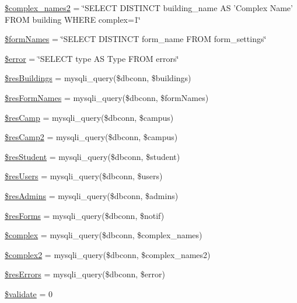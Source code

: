 \begin{DoxyCompactItemize}
\item 
\hyperlink{settings_8php_a1b9130a7b15f9d24c6c7b9f180f58c35}{\$complex\-\_\-names2} = \char`\"{}\-S\-E\-L\-E\-C\-T \-D\-I\-S\-T\-I\-N\-C\-T building\-\_\-name \-A\-S '\-Complex \-Name' \-F\-R\-O\-M building \-W\-H\-E\-R\-E complex=1\char`\"{}
\item 
\hyperlink{settings_8php_aeeee3257142a61e1147e755245933bc2}{\$form\-Names} = \char`\"{}\-S\-E\-L\-E\-C\-T \-D\-I\-S\-T\-I\-N\-C\-T form\-\_\-name \-F\-R\-O\-M form\-\_\-settings\char`\"{}
\item 
\hyperlink{settings_8php_aeba2ab722cedda53dbb7ec1a59f45550}{\$error} = \char`\"{}\-S\-E\-L\-E\-C\-T type \-A\-S \-Type \-F\-R\-O\-M errors\char`\"{}
\item 
\hyperlink{settings_8php_ad13e1ac4736397ee0c0755924e4a2167}{\$res\-Buildings} = mysqli\-\_\-query(\$dbconn, \$buildings)
\item 
\hyperlink{settings_8php_a3442ba39121c93784426f695600100ed}{\$res\-Form\-Names} = mysqli\-\_\-query(\$dbconn, \$form\-Names)
\item 
\hyperlink{settings_8php_a926be07138c512547f16ff9996acaf0b}{\$res\-Camp} = mysqli\-\_\-query(\$dbconn, \$campus)
\item 
\hyperlink{settings_8php_aeef360c79af90d6206e9afd0c3fb2f47}{\$res\-Camp2} = mysqli\-\_\-query(\$dbconn, \$campus)
\item 
\hyperlink{settings_8php_a6c39affecebae5119fae4099069c709b}{\$res\-Student} = mysqli\-\_\-query(\$dbconn, \$student)
\item 
\hyperlink{settings_8php_aee2bc5dc8abe81b77e854b5714fe4182}{\$res\-Users} = mysqli\-\_\-query(\$dbconn, \$users)
\item 
\hyperlink{settings_8php_a01f28ab79ba230a18421177d38277f7c}{\$res\-Admins} = mysqli\-\_\-query(\$dbconn, \$admins)
\item 
\hyperlink{settings_8php_ac1efa906f5ef5a29c1f02d9afc08e3df}{\$res\-Forms} = mysqli\-\_\-query(\$dbconn, \$notif)
\item 
\hyperlink{settings_8php_a25ec02534214977602829622b78b5d78}{\$complex} = mysqli\-\_\-query(\$dbconn, \$complex\-\_\-names)
\item 
\hyperlink{settings_8php_a0f1e56ea9ecb95074e133ed789db0d70}{\$complex2} = mysqli\-\_\-query(\$dbconn, \$complex\-\_\-names2)
\item 
\hyperlink{settings_8php_a1e38f7424dfc03f443c41bf83e9e90bd}{\$res\-Errors} = mysqli\-\_\-query(\$dbconn, \$error)
\item 
\hyperlink{settings_8php_a320b75b46e1832c327d9d47b4cea9e7d}{\$validate} = 0

\end{DoxyCompactItemize}
